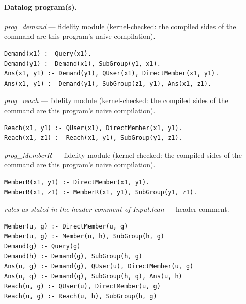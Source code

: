 \documentclass[10pt]{article}
\begin{document}
\paragraph{Datalog program(s).}

{\raggedright\textit{prog\_demand} --- fidelity module (kernel-checked: the compiled sides of the command are this program's naive compilation).\par}

\begin{Verbatim}[fontsize=\scriptsize,breaklines=true,breakanywhere=true,frame=single,framesep=1.5mm]
Demand(x1) :- Query(x1).
Demand(y1) :- Demand(x1), SubGroup(y1, x1).
Ans(x1, y1) :- Demand(y1), QUser(x1), DirectMember(x1, y1).
Ans(x1, y1) :- Demand(y1), SubGroup(z1, y1), Ans(x1, z1).
\end{Verbatim}

{\raggedright\textit{prog\_reach} --- fidelity module (kernel-checked: the compiled sides of the command are this program's naive compilation).\par}

\begin{Verbatim}[fontsize=\scriptsize,breaklines=true,breakanywhere=true,frame=single,framesep=1.5mm]
Reach(x1, y1) :- QUser(x1), DirectMember(x1, y1).
Reach(x1, z1) :- Reach(x1, y1), SubGroup(y1, z1).
\end{Verbatim}

{\raggedright\textit{prog\_MemberR} --- fidelity module (kernel-checked: the compiled sides of the command are this program's naive compilation).\par}

\begin{Verbatim}[fontsize=\scriptsize,breaklines=true,breakanywhere=true,frame=single,framesep=1.5mm]
MemberR(x1, y1) :- DirectMember(x1, y1).
MemberR(x1, z1) :- MemberR(x1, y1), SubGroup(y1, z1).
\end{Verbatim}

{\raggedright\textit{rules as stated in the header comment of Input.lean} --- header comment.\par}

\begin{Verbatim}[fontsize=\scriptsize,breaklines=true,breakanywhere=true,frame=single,framesep=1.5mm]
Member(u, g) :- DirectMember(u, g)
Member(u, g) :- Member(u, h), SubGroup(h, g)
Demand(g) :- Query(g)
Demand(h) :- Demand(g), SubGroup(h, g)
Ans(u, g) :- Demand(g), QUser(u), DirectMember(u, g)
Ans(u, g) :- Demand(g), SubGroup(h, g), Ans(u, h)
Reach(u, g) :- QUser(u), DirectMember(u, g)
Reach(u, g) :- Reach(u, h), SubGroup(h, g)
\end{Verbatim}
\end{document}

